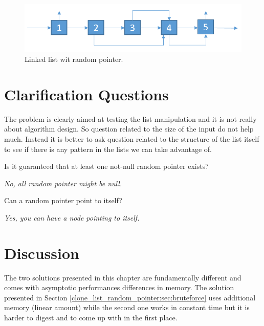 \begin{figure}
	\label{fig:clone_list_random_pointer:list1}
	\centering
	\includegraphics[scale=0.6]{sources/clone_list_random_pointer/images/random_list_1}
	\caption{Linked list wit random pointer.}
\end{figure}


\section{Clarification Questions}
The problem is clearly aimed at testing the list manipulation and it is not really about algorithm design. So question related to the size of the input do not help much. Instead it is better to ask question related to the structure of the list itself to see if there is any pattern in the lists we can take advantage of.
\begin{QandA}
	\item Is it guaranteed that at least one not-null random pointer exists?
	\begin{answered}
		\textit{No, all random pointer might be null.}
	\end{answered}
	\item Can a random pointer point to itself?
	\begin{answered}
		\textit{Yes, you can have a node pointing to itself.}
	\end{answered}
	
\end{QandA}

\section{Discussion}
\label{clone_list_random_pointer:sec:discussion}
The two solutions presented in this chapter are fundamentally different and comes with asymptotic performances differences in memory.
The solution presented in Section \ref{clone_list_random_pointer:sec:bruteforce} uses additional memory (linear amount) while the second one works in constant time but it is harder to digest and to come up with in the first place.

